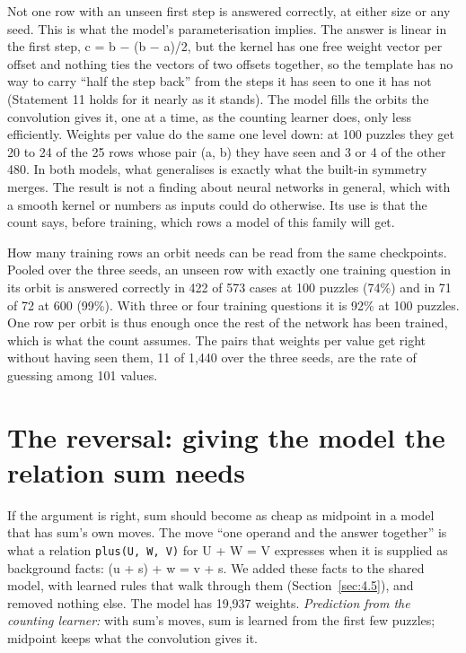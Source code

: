 Not one row with an unseen first step is answered correctly, at either size or any seed. This is what the model's parameterisation implies. The answer is linear in the first step, c = b − (b − a)/2, but the kernel has one free weight vector per offset and nothing ties the vectors of two offsets together, so the template has no way to carry ``half the step back'' from the steps it has seen to one it has not (Statement 11 holds for it nearly as it stands). The model fills the orbits the convolution gives it, one at a time, as the counting learner does, only less efficiently. Weights per value do the same one level down: at 100 puzzles they get 20 to 24 of the 25 rows whose pair (a, b) they have seen and 3 or 4 of the other 480. In both models, what generalises is exactly what the built-in symmetry merges. The result is not a finding about neural networks in general, which with a smooth kernel or numbers as inputs could do otherwise. Its use is that the count says, before training, which rows a model of this family will get.

How many training rows an orbit needs can be read from the same checkpoints. Pooled over the three seeds, an unseen row with exactly one training question in its orbit is answered correctly in 422 of 573 cases at 100 puzzles (74\%) and in 71 of 72 at 600 (99\%). With three or four training questions it is 92\% at 100 puzzles. One row per orbit is thus enough once the rest of the network has been trained, which is what the count assumes. The pairs that weights per value get right without having seen them, 11 of 1,440 over the three seeds, are the rate of guessing among 101 values.

\section{The reversal: giving the model the relation sum needs}\label{sec:7.6}

If the argument is right, sum should become as cheap as midpoint in a model that has sum's own moves. The move ``one operand and the answer together'' is what a relation \texttt{plus(U, W, V)} for U + W = V expresses when it is supplied as background facts: (u + s) + w = v + s. We added these facts to the shared model, with learned rules that walk through them (Section~\ref{sec:4.5}), and removed nothing else. The model has 19,937 weights. \emph{Prediction from the counting learner:} with sum's moves, sum is learned from the first few puzzles; midpoint keeps what the convolution gives it.

